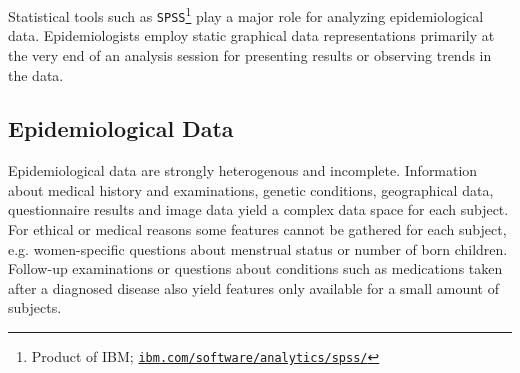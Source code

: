 \documentclass[journal]{style/vgtc} 			          %
\newcommand{\rem}[1]{\textcolor{red}{\sout{#1}}}
\newcommand{\com}[1]{\textcolor{orange}{\uline{#1}}}
\begin{document}
Statistical tools such as \texttt{SPSS}\footnote{Product of IBM; \href{http://ibm.com/software/analytics/spss/}{\texttt{ibm.com/software/analytics/spss/}}} play a major role for analyzing epidemiological data.
%
Epidemiologists employ static graphical data representations primarily at the very end of an analysis session for presenting results or observing trends in the data.
	
\subsection{Epidemiological Data} \label{EpidemiologicalData}
%

Epidemiological data are strongly heterogenous and incomplete.
%
Information about medical history and examinations, genetic conditions, geographical data, questionnaire results and image data yield a complex data space for each subject.
%
For ethical or medical reasons some features cannot be gathered for each subject, e.g. women-specific questions about menstrual status or number of born children.
%
Follow-up examinations or questions about conditions such as medications taken after a diagnosed disease also yield features only available for a small amount of subjects.
%
\end{document}
